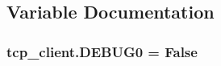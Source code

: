 \subsection{Variable Documentation}
\hypertarget{namespacetcp__client_a895ed640f9bf5e6fa45e32d6851fd3ec}{
\subsubsection[{D\-E\-B\-U\-G0}]{\setlength{\rightskip}{0pt plus 5cm}tcp\-\_\-client.\-D\-E\-B\-U\-G0 = False}}\label{namespacetcp__client_a895ed640f9bf5e6fa45e32d6851fd3ec}
